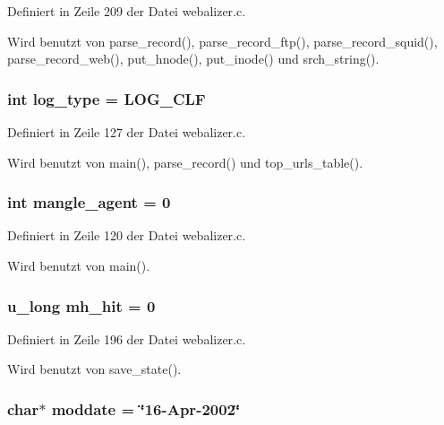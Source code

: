 Definiert in Zeile 209 der Datei webalizer.c.

Wird benutzt von parse\_\-record(), parse\_\-record\_\-ftp(), parse\_\-record\_\-squid(), parse\_\-record\_\-web(), put\_\-hnode(), put\_\-inode() und srch\_\-string().
\subsubsection{\setlength{\rightskip}{0pt plus 5cm}int {\bf log\_\-type} = LOG\_\-CLF}\label{webalizer_8c_d1e2a6d9014a2af70dfa80ce7b69d4b0}




Definiert in Zeile 127 der Datei webalizer.c.

Wird benutzt von main(), parse\_\-record() und top\_\-urls\_\-table().
\subsubsection{\setlength{\rightskip}{0pt plus 5cm}int {\bf mangle\_\-agent} = 0}\label{webalizer_8c_23d6ba920f8b5ddaea1f3e92958bdaba}




Definiert in Zeile 120 der Datei webalizer.c.

Wird benutzt von main().
\subsubsection{\setlength{\rightskip}{0pt plus 5cm}u\_\-long {\bf mh\_\-hit} = 0}\label{webalizer_8c_0fbe52a528ae909f4058a35bdab8d034}




Definiert in Zeile 196 der Datei webalizer.c.

Wird benutzt von save\_\-state().
\subsubsection{\setlength{\rightskip}{0pt plus 5cm}char$\ast$ {\bf moddate} = \char`\"{}16-Apr-2002\char`\"{}}\label{webalizer_8c_c000a634d0e3be8405dde288f429e91a}




